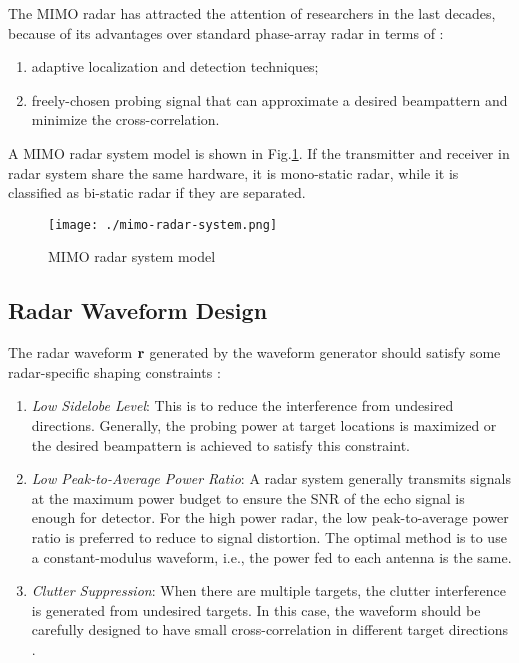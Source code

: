 The MIMO radar has attracted the attention of researchers in the last decades, because of its
advantages over standard phase-array radar in terms of \cite{stoica2007probing}:
\begin{enumerate}
    \item adaptive localization and detection techniques;
    \item freely-chosen probing signal that can approximate a desired beampattern and minimize the cross-correlation.
\end{enumerate}

A MIMO radar system model is shown in Fig.\ref{fig:mimo-radar-system-model}. 
If the transmitter and receiver in radar
system share the same hardware, it is mono-static radar, while it is classified as bi-static radar if they are separated.

\begin{figure}[htbp]
    \centering
    \texttt{[image: ./mimo-radar-system.png]}
    \caption{MIMO radar system model}
    \label{fig:mimo-radar-system-model}
\end{figure}

\subsection{Radar Waveform Design}
The radar waveform ${\bf r}$ generated by the waveform generator should satisfy some radar-specific shaping constraints \cite{liu2020tutorial}:
\begin{enumerate}
    \item \textit{Low Sidelobe Level}: This is to reduce the interference from undesired directions. Generally, the probing power
    at target locations is maximized or the desired beampattern is achieved to satisfy this constraint.
    \item \textit{Low Peak-to-Average Power Ratio}: A radar system generally transmits signals at the maximum power budget to ensure
    the SNR of the echo signal is enough for detector. For the high power radar, the low peak-to-average power ratio is preferred to reduce 
    to signal distortion. The optimal method is to use a constant-modulus waveform, i.e., the power fed to each antenna is the same.
    \item \textit{Clutter Suppression}: When there are multiple targets, the clutter interference is generated from undesired targets.
    In this case, the waveform should be carefully designed to have small cross-correlation in different target directions \cite{stoica2007probing}.
\end{enumerate}

